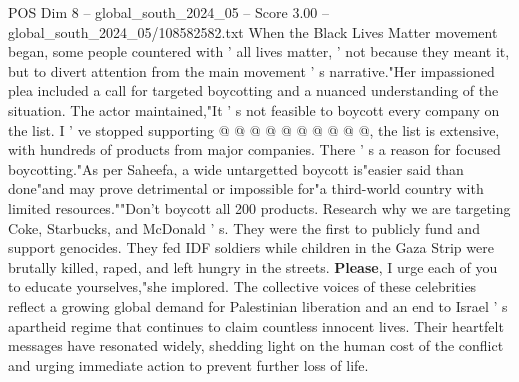 \begin{textsample}{POS Dim 8 – global\_south\_2024\_05 – Score 3.00 – global\_south\_2024\_05/108582582.txt}
When the Black Lives Matter movement began, some people countered with ' all lives matter, ' not because they meant it, but to divert attention from the main movement ' s narrative."Her impassioned plea included a call for targeted boycotting and a nuanced understanding of the situation.
The actor maintained,"It ' s not feasible to boycott every company on the list.
I ' ve stopped supporting @ @ @ @ @ @ @ @ @ @, the list is extensive, with hundreds of products from major companies.
There ' s a reason for focused boycotting."As per Saheefa, a wide untargetted boycott is"easier said than done"and may prove detrimental or impossible for"a third-world country with limited resources.""Don't boycott all 200 products.
Research why we are targeting Coke, Starbucks, and McDonald ' s.
They were the first to publicly fund and support genocides.
They fed IDF soldiers while children in the Gaza Strip were brutally killed, raped, and left hungry in the streets. \textbf{Please}, I urge each of you to educate yourselves,"she implored.
The collective voices of these celebrities reflect a growing global demand for Palestinian liberation and an end to Israel ' s apartheid regime that continues to claim countless innocent lives.
Their heartfelt messages have resonated widely, shedding light on the human cost of the conflict and urging immediate action to prevent further loss of life.

\end{textsample}
